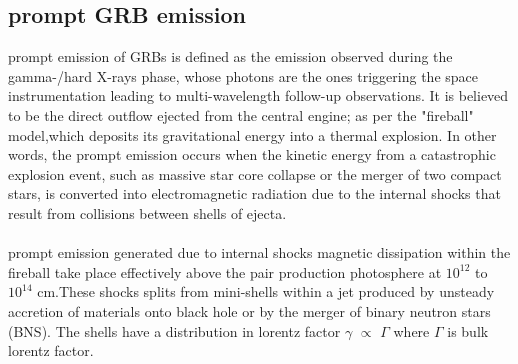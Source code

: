 \subsection{ prompt GRB emission}
 prompt emission of GRBs is defined as the emission observed during the gamma-/hard X-rays phase, whose photons are the ones triggering the space instrumentation leading to multi-wavelength follow-up observations.	It is believed to be the direct outflow ejected from the central engine; as per the "fireball" model,which deposits its gravitational energy into a thermal explosion. In other words, the prompt emission occurs when the kinetic energy from a catastrophic explosion event, such as massive star core collapse or the merger of two compact stars, is converted into electromagnetic radiation due to the internal shocks that result from collisions between shells of ejecta.\citep{23}\\\\
prompt emission generated due to internal shocks magnetic dissipation within the
fireball take place effectively above the pair production photosphere at $ 10^{12} $ to  $ 10^{14} $ cm.These shocks splits from mini-shells within a jet produced by unsteady accretion of materials onto black hole or by the merger of binary neutron stars (BNS). The shells have a distribution in lorentz factor $ \gamma $ $ \propto $ $ \Gamma $ where $ \Gamma $ is bulk lorentz factor.\citep {22}\citep{23}\\\\

